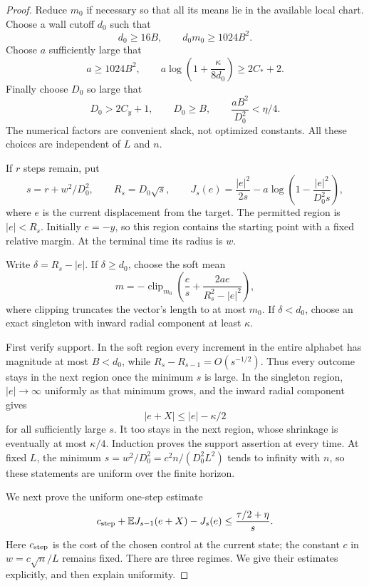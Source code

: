 \documentclass[11pt]{article}
\numberwithin{equation}{section}
\theoremstyle{definition}
\theoremstyle{remark}
\newcommand{\E}{\mathbb E}
\begin{document}
\begin{proof}
Reduce \(m_0\) if necessary so that all its means lie in the available
local chart.  Choose a wall cutoff \(d_0\) such that
\[
 d_0\geq16B,
 \qquad d_0m_0\geq1024B^2.
\]
Choose \(a\) sufficiently large that
\[
 a\geq1024B^2,
 \qquad
 a\log\left(1+\frac{\kappa}{8d_0}\right)\geq2C_*+2.
\]
Finally choose \(D_0\) so large that
\begin{equation}\label{ap:constants}
 D_0>2C_y+1,
 \qquad D_0\geq B,
 \qquad \frac{aB^2}{D_0^2}<\eta/4.
\end{equation}
The numerical factors are convenient slack, not optimized constants.
All these choices are independent of \(L\) and \(n\).

If \(r\) steps remain, put
\[
 s=r+w^2/D_0^2,
 \qquad R_s=D_0\sqrt s,
 \qquad
 J_s(e)=\frac{|e|^2}{2s}
       -a\log\left(1-\frac{|e|^2}{D_0^2s}\right),
\]
where \(e\) is the current displacement from the target.  The permitted
region is \(|e|<R_s\).  Initially \(e=-y\), so this region contains
the starting point with a fixed relative margin.  At the terminal time
its radius is \(w\).

Write \(\delta=R_s-|e|\).  If \(\delta\geq d_0\), choose the soft
mean
\begin{equation}\label{ap:feedback}
 m=-\operatorname{clip}_{m_0}
   \left(\frac e s+\frac{2ae}{R_s^2-|e|^2}\right),
\end{equation}
where clipping truncates the vector's length to at most \(m_0\).
If \(\delta<d_0\), choose an exact singleton with inward radial
component at least \(\kappa\).

First verify support.  In the soft region every increment in the entire
alphabet has magnitude at most \(B<d_0\), while
\(R_s-R_{s-1}=O(s^{-1/2})\).  Thus every outcome stays in the next
region once the minimum \(s\) is large.  In the singleton region,
\(|e|\to\infty\) uniformly as that minimum grows, and the inward
radial component gives
\[
 |e+X|\leq |e|-\kappa/2
\]
for all sufficiently large \(s\).  It too stays in the next region,
whose shrinkage is eventually at most \(\kappa/4\).  Induction proves
the support assertion at every time.  At fixed \(L\), the minimum
\(s=w^2/D_0^2=c^2n/(D_0^2L^2)\) tends to infinity with \(n\), so
these statements are uniform over the finite horizon.

We next prove the uniform one-step estimate
\begin{equation}\label{ap:one-step}
 c_{\rm step}+\E J_{s-1}(e+X)-J_s(e)
 \leq\frac{\tau/2+\eta}{s}.
\end{equation}
Here \(c_{\rm step}\) is the cost of the chosen control at the
current state; the constant \(c\) in \(w=c\sqrt n/L\) remains fixed.
There are three regimes.  We give their estimates explicitly, and then
explain uniformity.


\end{proof}
\end{document}
